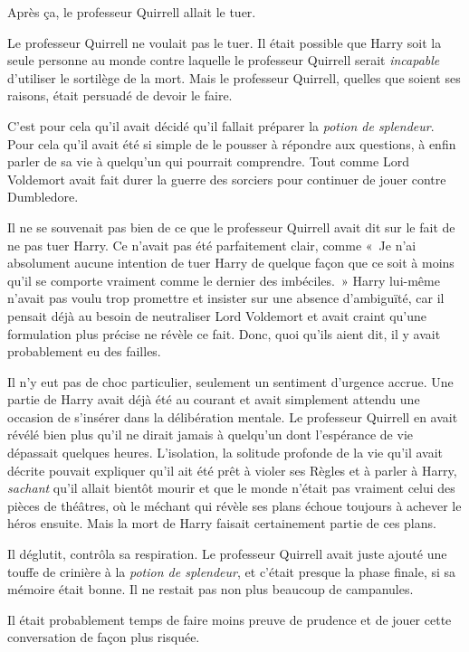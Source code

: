 Après ça, le professeur Quirrell allait le tuer.

Le professeur Quirrell ne voulait pas le tuer.
Il était possible que Harry soit la seule personne au monde contre laquelle le professeur Quirrell serait \emph{incapable} d'utiliser le sortilège de la mort.
Mais le professeur Quirrell, quelles que soient ses raisons, était persuadé de devoir le faire.

C'est pour cela qu'il avait décidé qu'il fallait préparer la \emph{potion de splendeur}.
Pour cela qu'il avait été si simple de le pousser à répondre aux questions, à enfin parler de sa vie à quelqu'un qui pourrait comprendre.
Tout comme Lord Voldemort avait fait durer la guerre des sorciers pour continuer de jouer contre Dumbledore.

Il ne se souvenait pas bien de ce que le professeur Quirrell avait dit sur le fait de ne pas tuer Harry.
Ce n'avait pas été parfaitement clair, comme «~Je n'ai absolument aucune intention de tuer Harry de quelque façon que ce soit à moins qu'il se comporte vraiment comme le dernier des imbéciles.~»
Harry lui-même n'avait pas voulu trop promettre et insister sur une absence d'ambiguïté, car il pensait déjà au besoin de neutraliser Lord Voldemort et avait craint qu'une formulation plus précise ne révèle ce fait.
Donc, quoi qu'ils aient dit, il y avait probablement eu des failles.

Il n'y eut pas de choc particulier, seulement un sentiment d'urgence accrue.
Une partie de Harry avait déjà été au courant et avait simplement attendu une occasion de s'insérer dans la délibération mentale.
Le professeur Quirrell en avait révélé bien plus qu'il ne dirait jamais à quelqu'un dont l'espérance de vie dépassait quelques heures.
L'isolation, la solitude profonde de la vie qu'il avait décrite pouvait expliquer qu'il ait été prêt à violer ses Règles et à parler à Harry, \emph{sachant} qu'il allait bientôt mourir et que le monde n'était pas vraiment celui des pièces de théâtres, où le méchant qui révèle ses plans échoue toujours à achever le héros ensuite.
Mais la mort de Harry faisait certainement partie de ces plans.

Il déglutit, contrôla sa respiration.
Le professeur Quirrell avait juste ajouté une touffe de crinière à la \emph{potion de splendeur}, et c'était presque la phase finale, si sa mémoire était bonne.
Il ne restait pas non plus beaucoup de campanules.

Il était probablement temps de faire moins preuve de prudence et de jouer cette conversation de façon plus risquée.

